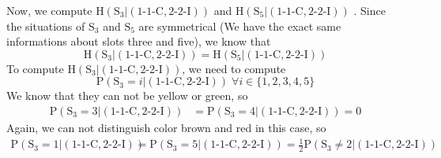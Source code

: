 \documentclass{article}
\begin{document}
Now, we compute $\mbox{H}(\mbox{S}_3|(\mbox{1-1-C},\mbox{2-2-I}))$ and $\mbox{H}(\mbox{S}_5|(\mbox{1-1-C},\mbox{2-2-I}))$ . Since the situations of $\mbox{S}_3$ and $\mbox{S}_5$ are symmetrical (We have the exact same informations about slots three and five), we know that
$$
\mbox{H}(\mbox{S}_3|(\mbox{1-1-C},\mbox{2-2-I})) = \mbox{H}(\mbox{S}_5|(\mbox{1-1-C},\mbox{2-2-I}))
$$
To compute $\mbox{H}(\mbox{S}_3|(\mbox{1-1-C},\mbox{2-2-I}))$, we need to compute 
$$
\mbox{P}(\mbox{S}_3=i|(\mbox{1-1-C},\mbox{2-2-I}))\; \forall i\in\{1,2,3,4,5\}
$$
We know that they can not be yellow or green, so
\begin{align*}
\mbox{P}(\mbox{S}_3=3|(\mbox{1-1-C},\mbox{2-2-I})) &= \mbox{P}(\mbox{S}_3=4|(\mbox{1-1-C},\mbox{2-2-I}))=0
\end{align*}
Again, we can not distinguish color brown and red in this case, so
\begin{align*}
\mbox{P}(\mbox{S}_3=1|(\mbox{1-1-C},\mbox{2-2-I})) &= \mbox{P}(\mbox{S}_3=5|(\mbox{1-1-C},\mbox{2-2-I})) =\frac{1}{2} \mbox{P}(\mbox{S}_3\not=2|(\mbox{1-1-C},\mbox{2-2-I}))
\end{align*}
\end{document}
